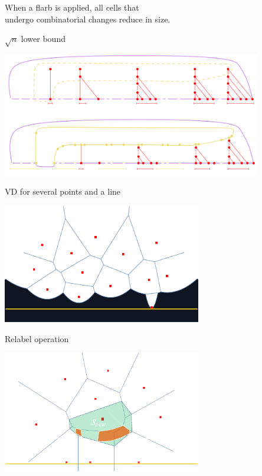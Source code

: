 \documentclass[17pt]{extarticle}
\newcommand{\newslide}[1]{\newpage \begin{center} \large #1 \end{center}}
\begin{document}
When a flarb is applied, all cells that \\
undergo combinatorial changes reduce in size.

\newslide{\(\sqrt{n}\) lower bound}

\begin{center}
	\includegraphics[width=0.85\textwidth]{figs/sqrtn}
\end{center}

\newslide{VD for several points and a line}

\begin{center}
	\includegraphics[width=0.65\textwidth]{figs/bl-ex-dark}
\end{center}

\newslide{Relabel operation}

\begin{center}
	\includegraphics[width=0.65\textwidth]{figs/combchange-dark}
\end{center}
\end{document}
